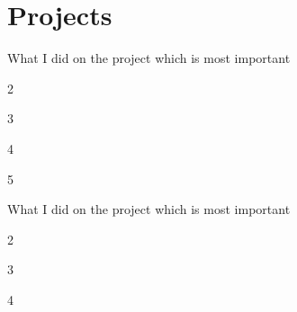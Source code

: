 \documentclass[letterpaper]{deedy-resume-openfont}
\begin{document}

\section{Projects}

\descript{}
\begin{tightemize}
\item What I did on the project which is most important
\item 2
\item 3
\item 4
\item 5
\end{tightemize}
\sectionsep

\descript{}
\begin{tightemize}
\item What I did on the project which is most important
\item 2
\item 3
\item 4
\end{tightemize}
\sectionsep


\end{document}
